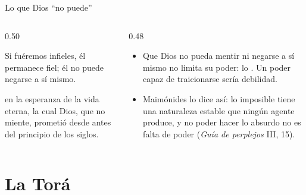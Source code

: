\begin{frame}{Lo que Dios ``no puede''}
\begin{columns}[t,onlytextwidth]
\begin{column}{0.50\textwidth}
\begin{cita}Si fuéremos infieles, él permanece fiel; él no puede negarse a sí mismo.\end{cita}
\begin{cita}en la esperanza de la vida eterna, la cual Dios, que no miente, prometió desde antes del principio de los siglos.\end{cita}
\end{column}
\begin{column}{0.48\textwidth}\small
\begin{itemize}
\item Que Dios no pueda mentir ni negarse a sí mismo no limita su poder: lo . Un poder capaz de traicionarse sería debilidad.
\item Maimónides lo dice así: lo imposible tiene una naturaleza estable que ningún agente produce, y no poder hacer lo absurdo no es falta de poder (\emph{Guía de perplejos} III, 15).
\end{itemize}
\end{column}
\end{columns}
\end{frame}

\section{La Torá}

